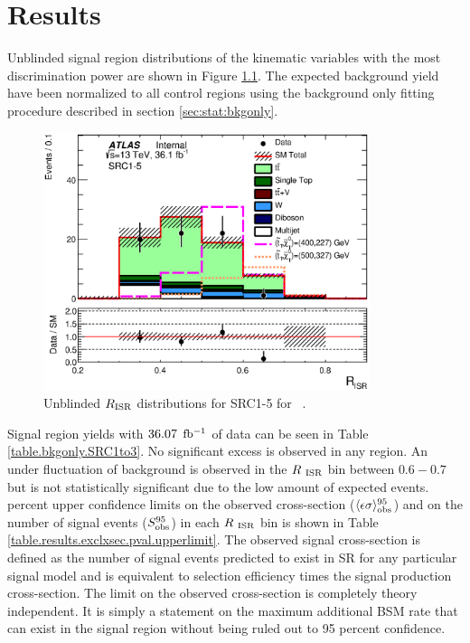 \chapter{Results}
\label{chap:Results}

\indent Unblinded signal region distributions of the kinematic variables with the most discrimination power are shown in Figure \ref{fig:SRCUnblined}.  The expected background yield have been normalized to all control regions using the background only fitting procedure described in section \ref{sec:stat:bkgonly}.  \\

\begin{figure}[!h] 
\begin{center}
\includegraphics[width=0.85\textwidth]{figures/SRC/CA_RISR_SRC1_5}
\caption{Unblinded $R_{\mathrm{ISR}}$  distributions for SRC1-5 for \intlumi\ \ifb.}
\label{fig:SRCUnblined}
\end{center}
\end{figure}

\indent Signal region yields with $36.07$ $\mbox{fb$^{-1}$}$ of data can be seen in Table \ref{table.bkgonly.SRC1to3}.  No significant excess is observed in any region.  An under fluctuation of background is observed in the $R_{~\mathrm{ISR}}$ bin between $0.6-0.7$ but is not statistically significant due to the low amount of expected events.  \\


%

 percent upper confidence limits on the observed cross-section ($\langle\epsilon\sigma\rangle_{\rm obs}^{95}$) and on the number of signal events ($S_{\rm obs}^{95}$) in each $R_{~\mathrm{ISR}}$ bin is shown in Table \ref{table.results.exclxsec.pval.upperlimit}.  The observed signal cross-section is defined as the number of signal events predicted to exist in SR for any particular signal model and is equivalent to selection efficiency times the signal production cross-section.  The limit on the observed cross-section is completely theory independent.  It is simply a statement on the maximum additional BSM rate that can exist in the signal region without being ruled out to 95 percent confidence. \\

